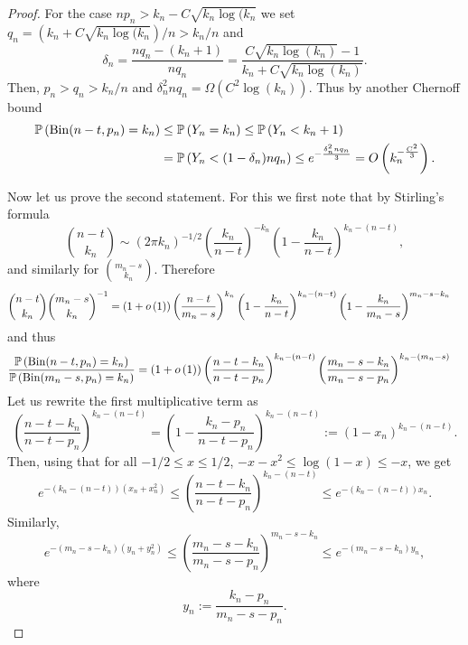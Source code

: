 \begin{appendices}
\begin{proof}
For the case $n p_n > k_n - C \sqrt{k_n \log(k_n}$ we set $q_n = (k_n + C \sqrt{k_n \log(k_n})/n > k_n/n$ and 
\[
	\delta_n = \frac{nq_n - (k_n +1)}{n q_n}
	= \frac{C \sqrt{k_n \log(k_n)} - 1}{k_n + C \sqrt{k_n \log(k_n)}}.
\]
Then, $p_n > q_n > k_n/n$ and $\delta_n^2 n q_n = \Omega\left(C^2 \log(k_n)\right)$. Thus by another Chernoff bound
\begin{align*}
	\mathbb{P}\left(\mathrm{Bin}(n-t,p_n) = k_n\right) &\le \mathbb{P}\left(Y_n = k_n\right) \le \mathbb{P}\left(Y_n < k_n+1\right)\\
	&= \mathbb{P}\left(Y_n < (1-\delta_n)nq_n\right)
		\le e^{-\frac{\delta_n^2 n q_n}{3}} = O\left(k_n^{-\frac{C^2}{3}}\right).
\end{align*}

Now let us prove the second statement. For this we first note that by Stirling's formula
\[
	\binom{n-t}{k_n} \sim (2\pi k_n)^{-1/2} \left(\frac{k_n}{n-t}\right)^{-k_n}\left(1 - \frac{k_n}{n-t}\right)^{k_n - (n-t)},
\]
and similarly for $\binom{m_n-s}{k_n}$. Therefore
\begin{align*}
	\binom{n-t}{k_n} \binom{m_n - s}{k_n}^{-1}
	&= (1+o\left(1\right)) \left(\frac{n - t}{m_n-s}\right)^{k_n}\left(1 - \frac{k_n}{n-t}\right)^{k_n - (n-t)}
		\left(1 - \frac{k_n}{m_n-s}\right)^{m_n - s - k_n}
\end{align*}
and thus
\begin{align*}
	\frac{\mathbb{P}\left(\mathrm{Bin}(n-t,p_n) = k_n\right)}{\mathbb{P}\left(\mathrm{Bin}(m_n-s,p_n) = k_n\right)}
	&= (1+o\left(1\right)) \left(\frac{n - t - k_n}{n - t - p_n}\right)^{k_n - (n-t)} 
		\left(\frac{m_n - s - k_n}{m_n-s - p_n}\right)^{k_n - (m_n - s)}
\end{align*}
Let us rewrite the first multiplicative term as 
\[
	\left(\frac{n - t - k_n}{n - t - p_n}\right)^{k_n - (n-t)} 
	= \left(1 - \frac{k_n - p_n}{n - t -p_n}\right)^{k_n - (n-t)} := (1-x_n)^{k_n - (n-t)}.
\]
Then, using that for all $-1/2 \le x \le 1/2$, $-x - x^2 \le \log(1-x) \le -x$, we get
\[
	e^{-(k_n - (n-t))\left(x_n + x_n^2\right)}
	\le \left(\frac{n - t - k_n}{n - t - p_n}\right)^{k_n - (n-t)}
	\le e^{-(k_n - (n-t))x_n}.
\]
Similarly,
\[
	e^{-(m_n - s- k_n)\left(y_n + y_n^2\right)}
	\le \left(\frac{m_n - s - k_n}{m_n-s - p_n}\right)^{m_n - s - k_n}
	\le e^{-(m_n - s - k_n)y_n},
\]
where
\[
	y_n := \frac{k_n - p_n}{m_n - s -p_n}.
\]


\end{proof}
\end{appendices}
